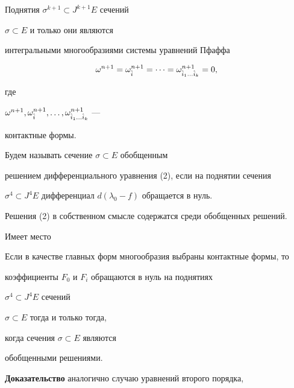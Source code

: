 Поднятия $\sigma^{k+1}\subset J^{k+1}E$ сечений


$\sigma\subset E$ и только они являются 


интегральными многообразиями системы уравнений Пфаффа


$$


\omega^{n+1}=\omega^{n+1}_{\Hat{i}}=\dotsb


=\omega^{n+1}_{\Hat{i}_1\dotsc\Hat{i}_k}=0,


$$


где


$\omega^{n+1},\omega^{n+1}_{\Hat{i}},\dotsc,


\omega^{n+1}_{\Hat{i}_1\dotsc\Hat{i}_k}$ ---


контактные формы.





\begin{defnnonum}


Будем называть сечение $\sigma\subset E$ обобщенным 


решением дифференциального уравнения (2), если на поднятии сечения


$\sigma^4\subset J^4E$ дифференциал $d(\lambda_0-f)$ обращается в нуль.


\end{defnnonum}





Решения (2) в собственном смысле содержатся среди обобщенных решений.


Имеет место





\begin{lem}


Если в качестве главных форм многообразия выбраны контактные формы, то


коэффициенты $F_0$ и $F_i$ обращаются в нуль на поднятиях


$\sigma^4\subset J^4E$ сечений


$\sigma\subset E$ тогда и только тогда,


когда сечения $\sigma\subset E$ являются


обобщенными решениями.


\end{lem}





{\bf Доказательство} аналогично случаю уравнений второго порядка,


